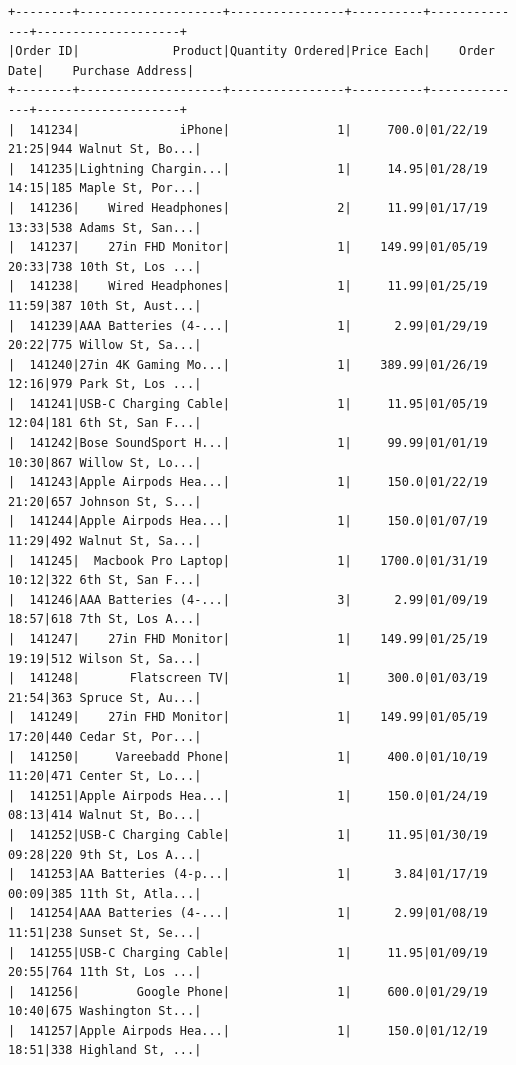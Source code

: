 \documentclass[
  letterpaper,
  DIV=11,
  numbers=noendperiod]{scrartcl}
\begin{document}
\begin{verbatim}
+--------+--------------------+----------------+----------+--------------+--------------------+
|Order ID|             Product|Quantity Ordered|Price Each|    Order Date|    Purchase Address|
+--------+--------------------+----------------+----------+--------------+--------------------+
|  141234|              iPhone|               1|     700.0|01/22/19 21:25|944 Walnut St, Bo...|
|  141235|Lightning Chargin...|               1|     14.95|01/28/19 14:15|185 Maple St, Por...|
|  141236|    Wired Headphones|               2|     11.99|01/17/19 13:33|538 Adams St, San...|
|  141237|    27in FHD Monitor|               1|    149.99|01/05/19 20:33|738 10th St, Los ...|
|  141238|    Wired Headphones|               1|     11.99|01/25/19 11:59|387 10th St, Aust...|
|  141239|AAA Batteries (4-...|               1|      2.99|01/29/19 20:22|775 Willow St, Sa...|
|  141240|27in 4K Gaming Mo...|               1|    389.99|01/26/19 12:16|979 Park St, Los ...|
|  141241|USB-C Charging Cable|               1|     11.95|01/05/19 12:04|181 6th St, San F...|
|  141242|Bose SoundSport H...|               1|     99.99|01/01/19 10:30|867 Willow St, Lo...|
|  141243|Apple Airpods Hea...|               1|     150.0|01/22/19 21:20|657 Johnson St, S...|
|  141244|Apple Airpods Hea...|               1|     150.0|01/07/19 11:29|492 Walnut St, Sa...|
|  141245|  Macbook Pro Laptop|               1|    1700.0|01/31/19 10:12|322 6th St, San F...|
|  141246|AAA Batteries (4-...|               3|      2.99|01/09/19 18:57|618 7th St, Los A...|
|  141247|    27in FHD Monitor|               1|    149.99|01/25/19 19:19|512 Wilson St, Sa...|
|  141248|       Flatscreen TV|               1|     300.0|01/03/19 21:54|363 Spruce St, Au...|
|  141249|    27in FHD Monitor|               1|    149.99|01/05/19 17:20|440 Cedar St, Por...|
|  141250|     Vareebadd Phone|               1|     400.0|01/10/19 11:20|471 Center St, Lo...|
|  141251|Apple Airpods Hea...|               1|     150.0|01/24/19 08:13|414 Walnut St, Bo...|
|  141252|USB-C Charging Cable|               1|     11.95|01/30/19 09:28|220 9th St, Los A...|
|  141253|AA Batteries (4-p...|               1|      3.84|01/17/19 00:09|385 11th St, Atla...|
|  141254|AAA Batteries (4-...|               1|      2.99|01/08/19 11:51|238 Sunset St, Se...|
|  141255|USB-C Charging Cable|               1|     11.95|01/09/19 20:55|764 11th St, Los ...|
|  141256|        Google Phone|               1|     600.0|01/29/19 10:40|675 Washington St...|
|  141257|Apple Airpods Hea...|               1|     150.0|01/12/19 18:51|338 Highland St, ...|

\end{verbatim}
\end{document}
